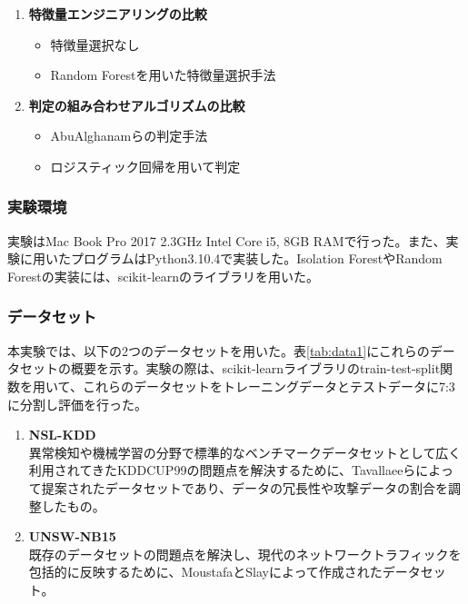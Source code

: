 \documentclass{css}
\begin{document}
\begin{enumerate}
    \item \textbf{特徴量エンジニアリングの比較}
        \begin{itemize}
            \item 特徴量選択なし
            \item Random Forestを用いた特徴量選択手法
        \end{itemize}
    \item \textbf{判定の組み合わせアルゴリズムの比較}
        \begin{itemize}
            \item AbuAlghanamらの判定手法\cite{AbuAlghanam2023-sx}
            \item ロジスティック回帰を用いて判定
        \end{itemize}
\end{enumerate}

\subsubsection{実験環境}

実験はMac Book Pro 2017 2.3GHz Intel Core i5, 8GB RAMで行った。また、実験に用いたプログラムはPython3.10.4で実装した。Isolation ForestやRandom Forestの実装には、scikit-learnのライブラリを用いた\cite{scikit-learn}。

\subsubsection{データセット}
本実験では、以下の2つのデータセットを用いた。表\ref{tab:data1}にこれらのデータセットの概要を示す。実験の際は、scikit-learnライブラリのtrain-test-split関数を用いて、これらのデータセットをトレーニングデータとテストデータに7:3に分割し評価を行った。

\begin{enumerate}
    \item \textbf{NSL-KDD}\\
        異常検知や機械学習の分野で標準的なベンチマークデータセットとして広く利用されてきたKDDCUP99\cite{KDDCUP99}の問題点を解決するために、Tavallaeeらによって提案されたデータセットであり、データの冗長性や攻撃データの割合を調整したもの\cite{Tavallaee2009-we}。
    \item \textbf{UNSW-NB15}\\
        既存のデータセットの問題点を解決し、現代のネットワークトラフィックを包括的に反映するために、MoustafaとSlayによって作成されたデータセット\cite{Moustafa2015-cg}。
\end{enumerate}
\end{document}
